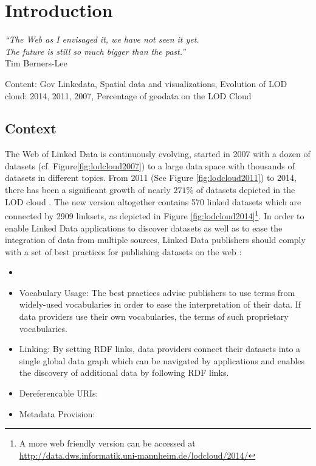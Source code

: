 \chapter{Introduction}
\label{intro}

\begin{flushright}
\textit{``The Web as I envisaged it, we have not seen it yet.\\ 
The future is still so much bigger than the past.''\\}
Tim Berners-Lee
\end{flushright}
Content: Gov Linkedata, Spatial data and visualizations, Evolution of LOD cloud: 2014, 2011, 2007, Percentage of geodata on the LOD Cloud


\section{Context}
\label{sec:context}

The Web of Linked Data is continuously evolving, started in 2007 with a dozen of datasets (cf. Figure\ref{fig:lodcloud2007}) to a large data space with thousands of datasets in different topics. From 2011 (See Figure \ref{fig:lodcloud2011})\cite{jentzsch2011} to 2014, there has been a significant growth of nearly $271\%$ of datasets depicted in the LOD cloud \cite{max2014}. The new version altogether contains 570 linked datasets which are connected by 2909 linksets, as depicted in Figure \ref{fig:lodcloud2014}\footnote{A more web friendly version can be accessed at \url{http://data.dws.informatik.uni-mannheim.de/lodcloud/2014/}}. In order to enable
Linked Data applications to discover datasets as well as to ease the integration of data from multiple sources, Linked Data publishers should comply with a set of best practices for publishing datasets on the web \cite{Heath2011}:

\begin{itemize}
\item {}

\item Vocabulary Usage: The best practices advise publishers to use terms from
widely-used vocabularies in order to ease the interpretation of their data. If data providers use their own vocabularies, the terms of such proprietary vocabularies.

\item Linking: By setting RDF links, data providers connect their datasets into a single global data graph which can be navigated by applications and enables the discovery of additional data by following RDF links.

\item Dereferencable URIs:  

\item Metadata Provision: 
\end{itemize}

